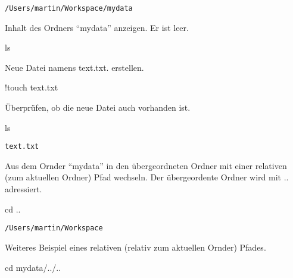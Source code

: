 \documentclass[
  11pt,
  a4paper,
  DIV=11,
  numbers=noendperiod]{scrartcl}
\newenvironment{Shaded}{\begin{snugshade}}{\end{snugshade}}
\newcommand{\NormalTok}[1]{\textcolor[rgb]{0.00,0.23,0.31}{#1}}
\newcommand{\OperatorTok}[1]{\textcolor[rgb]{0.37,0.37,0.37}{#1}}
\begin{document}
\begin{verbatim}
/Users/martin/Workspace/mydata
\end{verbatim}

Inhalt des Ordners ``mydata'' anzeigen. Er ist leer.

\begin{Shaded}
\begin{Highlighting}[numbers=left,,]
\NormalTok{ls}
\end{Highlighting}
\end{Shaded}

Neue Datei namens text.txt. erstellen.

\begin{Shaded}
\begin{Highlighting}[numbers=left,,]
\OperatorTok{!}\NormalTok{touch text.txt}
\end{Highlighting}
\end{Shaded}

Überprüfen, ob die neue Datei auch vorhanden ist.

\begin{Shaded}
\begin{Highlighting}[numbers=left,,]
\NormalTok{ls }
\end{Highlighting}
\end{Shaded}

\begin{verbatim}
text.txt
\end{verbatim}

Aus dem Ornder ``mydata'' in den übergeordneten Ordner mit einer
relativen (zum aktuellen Ordner) Pfad wechseln. Der übergeordente Ordner
wird mit .. adressiert.

\begin{Shaded}
\begin{Highlighting}[numbers=left,,]
\NormalTok{cd ..}
\end{Highlighting}
\end{Shaded}

\begin{verbatim}
/Users/martin/Workspace
\end{verbatim}

Weiteres Beispiel eines relativen (relativ zum aktuellen Ornder) Pfades.

\begin{Shaded}
\begin{Highlighting}[numbers=left,,]
\NormalTok{cd mydata}\OperatorTok{/}\NormalTok{..}\OperatorTok{/}\NormalTok{..}
\end{Highlighting}
\end{Shaded}
\end{document}
